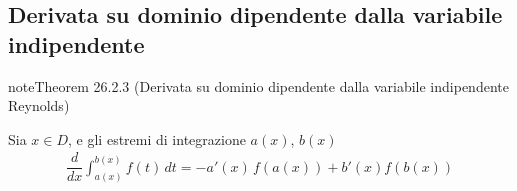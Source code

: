 \documentclass[letterpaper,10pt,italian]{jupyterBook}
\begin{document}
\subsection{Derivata su dominio dipendente dalla variabile indipendente}
\label{\detokenize{ch/infinitesimal_calculus/integrals:derivata-su-dominio-dipendente-dalla-variabile-indipendente}}\label{\detokenize{ch/infinitesimal_calculus/integrals:infinitesimal-calculus-integrals-thm-fund-reynolds}}\label{ch/infinitesimal_calculus/integrals:integrals:thm:fund:reynolds}
\begin{sphinxadmonition}{note}{Theorem 26.2.3 (Derivata su dominio dipendente dalla variabile indipendente \sphinxhyphen{} Reynolds)}



\sphinxAtStartPar
Sia \(x \in D\), e gli estremi di integrazione \(a(x)\), \(b(x)\)  
\begin{equation*}
\begin{split}\dfrac{d}{dx} \int_{a(x)}^{b(x)} f(t) \, dt = - a'(x) \, f(a(x)) + b'(x) f(b(x)) \end{split}
\end{equation*}\end{sphinxadmonition}
\end{document}
